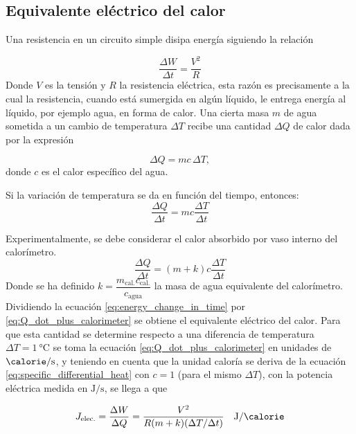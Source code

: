 
\subsection{Equivalente eléctrico del calor}
Una resistencia en un circuito simple disipa energía siguiendo la relación

\begin{equation}
    \label{eq:energy_change_in_time}
    \frac{\Delta W}{\Delta t} = \frac{V^2}{R}
\end{equation}
Donde $V$ es la tensión y $R$ la resistencia eléctrica, esta razón es precisamente a la cual la resistencia, cuando está sumergida en algún líquido, le entrega energía al líquido, por ejemplo agua, en forma de calor.
Una cierta masa $m$ de agua sometida a un cambio de temperatura $\Delta T$ recibe una cantidad $\Delta Q$ de calor dada por la expresión

\begin{equation}
    \Delta Q = mc\,\Delta T, \label{eq:specific_differential_heat}
\end{equation}
donde $c$ es el calor específico del agua.

Si la variación de temperatura se da en función del tiempo, entonces:
\begin{equation}
    \frac{\Delta Q}{\Delta t} = mc \frac{\Delta T}{\Delta t}
    \label{eq:heat_change_in_time}
\end{equation}

Experimentalmente, se debe considerar el calor absorbido por vaso interno del calorímetro. 
\begin{equation}
    \frac{\Delta Q}{\Delta t} = (m + k)c \frac{\Delta T}{\Delta t}
    \label{eq:Q_dot_plus_calorimeter}
\end{equation}
Donde se ha definido $k=\dfrac{m_{\text{cal.}}c_{\text{cal.}}}{c_{\text{agua}}}$ la masa de agua equivalente del calorímetro.
Dividiendo la ecuación \eqref{eq:energy_change_in_time} por \eqref{eq:Q_dot_plus_calorimeter} se obtiene el equivalente eléctrico del calor. Para que esta cantidad se determine respecto a una diferencia de temperatura $\Delta T = \SI{1}{\celsius}$ se toma la ecuación \eqref{eq:Q_dot_plus_calorimeter} en unidades de $\si{\calorie\per\second}$, y teniendo en cuenta que la unidad caloría se deriva de la ecuación \eqref{eq:specific_differential_heat} con $c=1$ (para el mismo $\Delta T$), con la potencia eléctrica medida en $\si{\joule\per\second}$, se llega a que

\begin{equation}
    \label{eq:electrical_equivalent}
    J_{\text{elec.}}=\frac{\Delta W}{\Delta Q} = \dfrac{V^2}{R (m + k) (\Delta T / \Delta t)} 
    \quad \si{\joule\per\calorie}
\end{equation}
